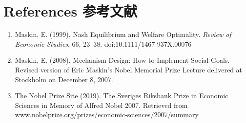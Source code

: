 \documentclass[12pt,a4paper]{article}
\newenvironment{original}{%
  \par\vspace{4pt}\noindent%
  \color{black}%
  \ignorespaces
}{%
  \par\vspace{2pt}%
}
\begin{document}
\section*{References \hfill 参考文献}

\begin{original}
\begin{enumerate}[leftmargin=2em, itemsep=4pt]
\item Maskin, E. (1999). Nash Equilibrium and Welfare Optimality. \textit{Review of Economic Studies}, 66, 23--38. doi:10.1111/1467-937X.00076
\item Maskin, E. (2008). Mechanism Design: How to Implement Social Goals. Revised version of Eric Maskin's Nobel Memorial Prize Lecture delivered at Stockholm on December 8, 2007.
\item The Nobel Prize Site (2019). The Sveriges Riksbank Prize in Economic Sciences in Memory of Alfred Nobel 2007. Retrieved from www.nobelprize.org/prizes/economic-sciences/2007/summary
\end{enumerate}
\end{original}
\end{document}
